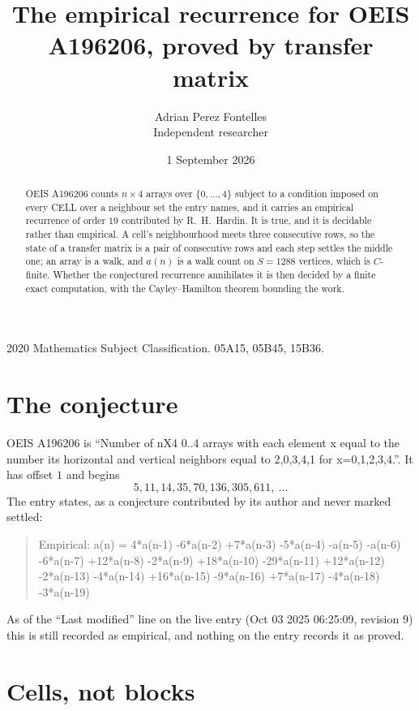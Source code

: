 \documentclass[11pt,a4paper]{article}
\title{The empirical recurrence for OEIS A196206, proved by transfer matrix}
\author{Adrian Perez Fontelles\\ \small Independent researcher}
\date{1 September 2026}
\theoremstyle{plain}
\theoremstyle{definition}
\begin{document}
\maketitle

\begin{abstract}
OEIS A196206 counts $n\times4$ arrays over $\{0,\dots,4\}$ subject to a condition imposed on
every CELL over a neighbour set the entry names, and it carries an empirical recurrence of
order $19$ contributed by R.~H.~Hardin. It is true, and it is decidable rather than
empirical. A cell's neighbourhood meets three consecutive rows, so the state of a transfer
matrix is a pair of consecutive rows and each step settles the middle one; an array is a
walk, and $a(n)$ is a walk count on $S=1288$ vertices, which is $C$-finite. Whether the
conjectured recurrence annihilates it is then decided by a finite exact computation, with the
Cayley--Hamilton theorem bounding the work.
\end{abstract}

\noindent\small 2020 Mathematics Subject Classification. 05A15, 05B45, 15B36.\normalsize

\section{The conjecture}

OEIS A196206 is ``Number of nX4 0..4 arrays with each element x equal to the number its horizontal and vertical neighbors equal to 2,0,3,4,1 for x=0,1,2,3,4.''. It has offset $1$ and begins
\[
5, 11, 14, 35, 70, 136, 305, 611,\ \dots
\]
The entry states, as a conjecture contributed by its author and never marked settled:
\begin{quote}
Empirical: a(n) = 4*a(n-1) -6*a(n-2) +7*a(n-3) -5*a(n-4) -a(n-5) -a(n-6) -6*a(n-7) +12*a(n-8) -2*a(n-9) +18*a(n-10) -29*a(n-11) +12*a(n-12) -2*a(n-13) -4*a(n-14) +16*a(n-15) -9*a(n-16) +7*a(n-17) -4*a(n-18) -3*a(n-19)
\end{quote}
As of the ``Last modified'' line on the live entry (Oct 03 2025 06:25:09, revision 9) this is still
recorded as empirical, and nothing on the entry records it as proved.

\section{Cells, not blocks}
\end{document}
